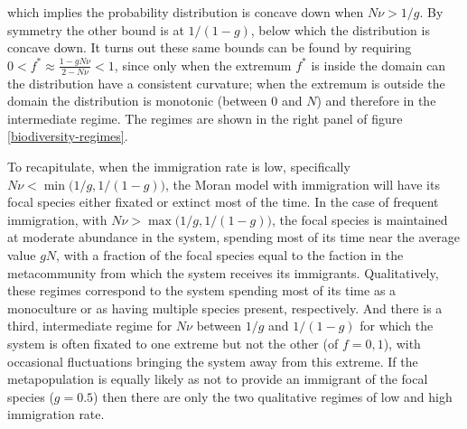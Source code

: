 which implies the probability distribution is concave down when $N\nu > 1/g$. %
By symmetry the other bound is at $1/(1-g)$, below which the distribution is concave down. 
It turns out these same bounds can be found by requiring $0<f^*\approx\frac{1-g N\nu}{2-N\nu}<1$, since only when the extremum $f^*$ is inside the domain can the distribution have a consistent curvature; when the extremum is outside the domain the distribution is monotonic (between $0$ and $N$) and therefore in the intermediate regime. 
The regimes are shown in the right panel of figure \ref{biodiversity-regimes}. 


%
To recapitulate, when the immigration rate is low, specifically $N\nu < \min\big(1/g,1/(1-g)\big)$, the Moran model with immigration will have its focal species either fixated or extinct most of the time. 
In the case of frequent immigration, with $N\nu > \max\big(1/g,1/(1-g)\big)$, the focal species is maintained at moderate abundance in the system, spending most of its time near the average value $gN$, with a fraction of the focal species equal to the faction in the metacommunity from which the system receives its immigrants. 
Qualitatively, these regimes correspond to the system spending most of its time as a monoculture or as having multiple species present, respectively. 
And there is a third, intermediate regime for $N\nu$ between $1/g$ and $1/(1-g)$ for which the system is often fixated to one extreme but not the other (of $f=0,1$), with occasional fluctuations bringing the system away from this extreme. 
If the metapopulation is equally likely as not to provide an immigrant of the focal species ($g=0.5$) then there are only the two qualitative regimes of low and high immigration rate. %

